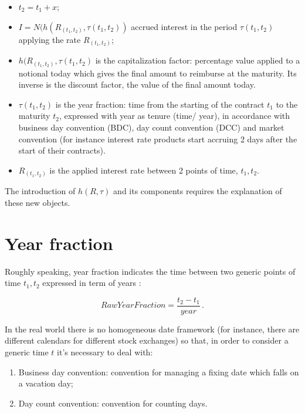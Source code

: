 \begin{itemize}
    \item $t_{2}=t_{1}+x$;
    \item $I = N(h(R_{(t_{1},t_{2})},\tau(t_{1},t_{2}))$ accrued interest in the period $\tau(t_{1},t_{2})$ applying the rate $R_{(t_{1},t_{2})}$;
    \item $h(R_{(t_{1},t_{2})},\tau(t_{1},t_{2})$ is the capitalization factor: percentage value applied to a notional today which gives the final amount to reimburse at the maturity.
    Its inverse is the discount factor, the value of the final amount today.
    \item $\tau(t_{1},t_{2})$ is the year fraction: time from the starting of the contract $t_{1}$ to the maturity $t_{2}$, expressed with year as tenure (time/ year), in accordance with business day convention (BDC), day count convention (DCC) and market convention (for instance interest rate products start accruing 2 days after the start of their contracts).
    \item $R_{(t_{1},t_{2})}$ is the applied interest rate between 2 points of time, $t_{1},t_{2}$.
    
\end{itemize}

The introduction of $h(R,\tau)$ and its components requires the explanation of these new objects.

\section{Year fraction}

Roughly speaking, year fraction indicates the time between two generic points of time $t_{1},t_{2}$ expressed in term of years : 

\begin{equation}
    RawYearFraction=\dfrac{t_{2}-t_{1}}{year}\,.
    \label{eq:raw_yf}
\end{equation}

In the real world there is no homogeneous date framework (for instance, there are different calendars for different stock exchanges) so that, in order to consider a generic time $t$ it's necessary to deal with:

\begin{enumerate}
\item Business day convention: convention for managing a fixing date which falls on a vacation day;
\item Day count convention: convention for counting days.
\end{enumerate}


